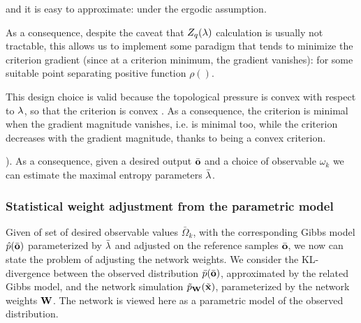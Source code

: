 {
and it is easy to approximate:
under the ergodic assumption.

As a consequence, despite the caveat that $Z_q({\bf \lambda})$ calculation is usually not tractable, this allows us to implement some paradigm that tends to minimize the criterion gradient (since at a criterion minimum, the gradient vanishes):
 for some suitable point separating positive function $\rho()$. 

This design choice is valid because the topological pressure is convex with respect to ${\bf \lambda}$, so that the criterion is convex \cite{vasquez:inria-00574954}. As a consequence, the criterion is minimal when the gradient magnitude vanishes, i.e. is minimal too, while the criterion decreases with the gradient magnitude, thanks to being a convex criterion.\hr}). As a consequence, given a desired output $\bar{\bf o}$ and a choice of observable $\omega_k$ we can estimate the maximal entropy parameters $\bar{\bf \lambda}$.

\subsubsection*{Statistical weight adjustment from the parametric model}

Given of set of desired observable values $\bar{\Omega}_k$, with the corresponding Gibbs model $\hat{p}(\bar{\bf o})$ parameterized by $\bar{\bf \lambda}$ and adjusted on the reference samples $\bar{\bf o}$, we now can state the problem of adjusting the network weights. We consider the KL-divergence between the observed distribution $\bar{p}(\bar{\bf o})$, approximated by the related Gibbs model, and the network simulation $\tilde{p}_{\bf W}(\tilde{\bf x})$, parameterized by the network weights ${\bf W}$. The network is viewed here as a parametric model of the observed distribution. 

